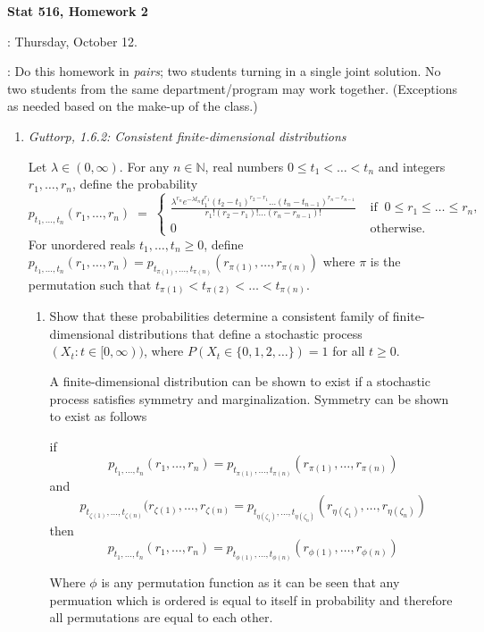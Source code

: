 \documentclass{article} %
\newcommand{\sectionname}[1]{\vspace{0.5cm} \noindent {\bf #1}}
\begin{document}
\begin{center}
  \textbf{\large Stat 516, Homework 2}
\end{center}
\sectionname{Due date}:  Thursday, October 12.

: Do this homework in \emph{pairs}; two students
turning in a single joint solution.  No two students from the same
department/program may work together.  (Exceptions as needed based on
the make-up of the class.)



\begin{enumerate}
\item {\it Guttorp, 1.6.2: Consistent finite-dimensional
    distributions}

  Let $\lambda\in(0,\infty)$.  For any $n\in\mathbb{N}$, real numbers
  $0\le t_1<\dots<t_n$ and integers $r_1,\dots,r_n$, define the
  probability
  \[
  p_{t_1,\dots,t_n}(r_1,\dots,r_n) \;=\;
  \begin{cases}
    \displaystyle
    \frac{\lambda^{r_n}
      e^{-\lambda t_n} t_1^{r_1}(t_2-t_1)^{r_2-r_1}\dots
      (t_n-t_{n-1})^{r_n-r_{n-1}}}{r_1!(r_2-r_1)! \dots
      (r_n-r_{n-1})!} &\text{ if } \ 0\le r_1\le \dots\le r_n,\\
    0 &\text{ otherwise}.
  \end{cases}
  \]
  For unordered reals $t_1,\dots,t_n\ge 0$, define
  $p_{t_1,\dots,t_n}(r_1,\dots,r_n)=p_{t_{\pi(1)},\dots,t_{\pi(n)}}(r_{\pi(1)},\dots,r_{\pi(n)})$
  where $\pi$ is the permutation such that
  $t_{\pi(1)}<t_{\pi(2)}<\dots<t_{\pi(n)}$.
  \begin{enumerate}
  \item Show that these probabilities determine a consistent family of
    finite-dimensional distributions that define a stochastic process
    $(X_t:t\in[0,\infty))$, where $P(X_t\in\{0,1,2,\dots\})=1$ for all
    $t\ge 0$.

A finite-dimensional distribution can be shown to exist if a stochastic process
satisfies symmetry and marginalization. Symmetry can be shown to exist as follows

if
$$
p_{t_1,\dots,t_n}(r_1,\dots,r_n)=p_{t_{\pi(1)},\dots,t_{\pi(n)}}(r_{\pi(1)},\dots,r_{\pi(n)})
$$
and
$$
p_{t_{\zeta(1)},\dots,t_{\zeta(n)}}(r_{\zeta(1)},\dots,r_{\zeta(n)}=
p_{t_{\eta(\zeta_1)},\dots,t_{\eta(\zeta_n)}}(r_{\eta(\zeta_1)},\dots,r_{\eta(\zeta_n)})
$$
then
$$
p_{t_1,\dots,t_n}(r_1,\dots,r_n)=p_{t_{\phi(1)},\dots,t_{\phi(n)}}(r_{\phi(1)},\dots,r_{\phi(n)})
$$

Where $\phi$ is any permutation function as it can be seen that any permuation
which is ordered is equal to itself in probability and therefore all
permutations are equal to each other.


\end{enumerate}
\end{enumerate}
\end{document}
